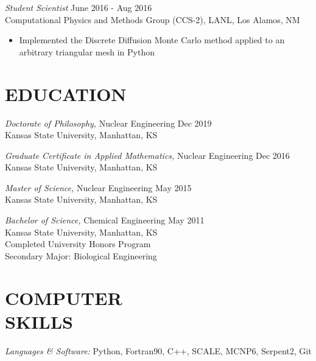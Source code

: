 \documentclass[margin, 10pt]{res} %
\begin{document}
\begin{resume}

{\sl Student Scientist} \hfill June 2016 - Aug 2016 \\
Computational Physics and Methods Group (CCS-2), LANL, Los Alamos, NM
\begin{itemize}
\item Implemented the Discrete Diffusion Monte Carlo method applied to an arbitrary triangular mesh in Python
\end{itemize}

\section{EDUCATION}

{\sl Doctorate of Philosophy,} Nuclear Engineering \hfill Dec 2019\\
Kansas State University, Manhattan, KS

{\sl Graduate Certificate in Applied Mathematics,} Nuclear Engineering \hfill Dec 2016\\
Kansas State University, Manhattan, KS

{\sl Master of Science,} Nuclear Engineering \hfill May 2015\\
Kansas State University, Manhattan, KS

{\sl Bachelor of Science,} Chemical Engineering \hfill May 2011 \\
Kansas State University, Manhattan, KS \\
Completed University Honors Program \\
Secondary Major: Biological Engineering

\section{COMPUTER \\ SKILLS}

{\sl Languages \& Software:}
Python, Fortran90, C++, SCALE, MCNP6, Serpent2, Git  \\


\end{resume}
\end{document}
